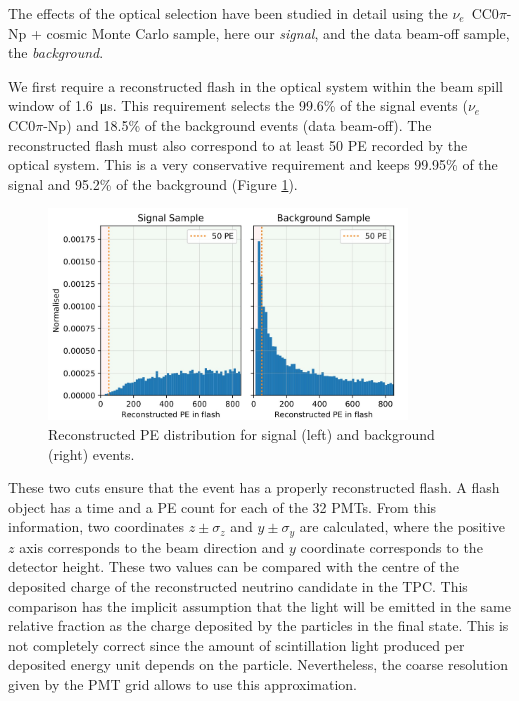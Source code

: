 The effects of the optical selection have been studied in detail using the $\nu_{e}$~CC0$\pi$-Np + cosmic Monte Carlo sample, here our \emph{signal}, and the data beam-off sample, the \emph{background}.

We first require a reconstructed flash in the optical system within the beam spill window of \SI{1.6}{\micro\s}. This requirement selects the 99.6\% of the signal events ($\nu_{e}$ CC0$\pi$-Np) and 18.5\% of the background events (data beam-off). 
The reconstructed flash must also correspond to at least 50 PE recorded by the optical system. This is a very conservative requirement and keeps 99.95\% of the signal and 95.2\% of the background (Figure \ref{fig:pe_cut}).

\begin{figure}[htbp]
\centering
\includegraphics[width=0.85\textwidth]{figures/pe_cut.jpg} 
\caption{Reconstructed PE distribution for signal (left) and background (right) events.} 
\label{fig:pe_cut}
\end{figure}

These two cuts ensure that the event has a properly reconstructed flash. A flash object has a time and a PE count for each of the 32 PMTs. From this information, two coordinates $z\pm \sigma_z$ and $y\pm \sigma_y$ are calculated, where the positive $z$ axis corresponds to the beam direction and $y$ coordinate corresponds to the detector height. These two values can be compared with the centre of the deposited charge of the reconstructed neutrino candidate in the TPC. This comparison has the implicit assumption that the light will be emitted in the same relative fraction as the charge deposited by the particles in the final state. This is not completely correct since the amount of scintillation light produced per deposited energy unit depends on the particle. Nevertheless, the coarse resolution given by the PMT grid allows to use this approximation.

